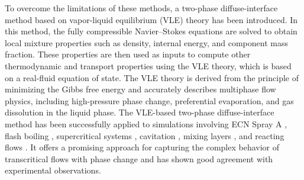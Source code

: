 To overcome the limitations of these methods, a two-phase diffuse-interface method based on vapor-liquid equilibrium (VLE) theory has been introduced. In this method, the fully compressible Navier–Stokes equations are solved to obtain local mixture properties such as density, internal energy, and component mass fraction. These properties are then used as inputs to compute other thermodynamic and transport properties using the VLE theory, which is based on a real-fluid equation of state. The VLE theory is derived from the principle of minimizing the Gibbs free energy and accurately describes multiphase flow physics, including high-pressure phase change, preferential evaporation, and gas dissolution in the liquid phase. The VLE-based two-phase diffuse-interface method has been successfully applied to simulations involving ECN Spray A \cite{matheis2018multi, yang2020real}, flash boiling \cite{yi2019multicomponent}, supercritical  systems \cite{zhang2022multicomponent}, cavitation \cite{yang2020parametric}, mixing layers \cite{tudisco2020vapor}, and reacting flows \cite{fathi2022large,srinivasan2023vle}. It offers a promising approach for capturing the complex behavior of transcritical flows with phase change and has shown good agreement with experimental observations. 

